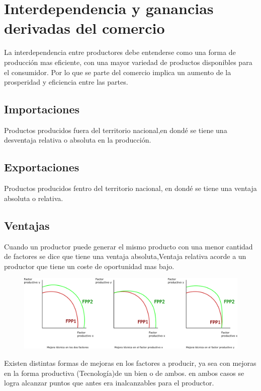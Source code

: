 \newpage
\section{Interdependencia y ganancias derivadas del comercio} La interdependencia entre productores debe entenderse como una forma de producción mas eficiente, con una mayor variedad de productos disponibles para el consumidor. Por lo que se parte del comercio implica un aumento de la prosperidad y eficiencia entre las partes. 
\subsection{Importaciones} Productos producidos fuera del territorio nacional,en dondé se tiene una desventaja relativa o absoluta en la producción. 
\subsection{Exportaciones} Productos producidos fentro del territorio nacional, en dondé se tiene una ventaja absoluta o relativa.  
\subsection{Ventajas} Cuando un productor puede generar el mismo producto con una menor cantidad de factores se dice que tiene una ventaja absoluta,Ventaja relativa acorde a un productor que tiene un coste de oportunidad mas bajo.

\begin{figure}[h]
\includegraphics[scale=0.3]{images/Desplazamientos_en_la_FPP.png}
\end{figure}
Existen distintas formas de mejoras en los factores a producir, ya sea con mejoras en la forma productiva (Tecnología)de un bien o de ambos. en ambos casos se logra alcanzar puntos que antes era inalcanzables para el productor.

